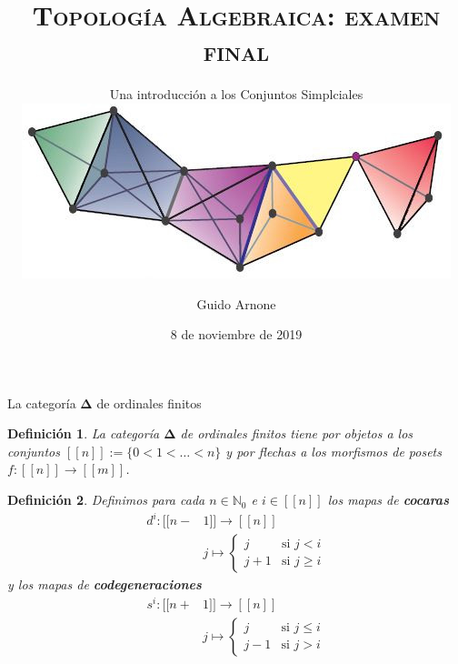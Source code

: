 \documentclass[11pt]{beamer}
\newcommand{\N}{\mathbb{N}}
\newcommand{\nat}[1]{[\![#1]\!]}
\newcommand{\ord}[1]{\nat{#1}}
\newcommand{\ordcat}{\boldsymbol{\Delta}}
\newtheorem{defs}{Definición}
\begin{document}
\author{Guido Arnone}
\title{\scshape Topología Algebraica: examen final}
\subtitle{Una introducción a los Conjuntos Simplciales\\
\vspace{20pt}
\includegraphics[width=0.75\textheight]{portada.jpg}}
\date{8 de noviembre de 2019}
\subject{Topología Algebraica}

\begin{frame}
\titlepage
\end{frame}

\begin{frame}{La categoría $\ordcat$ de ordinales finitos}
\begin{defs} La categoría $\ordcat$ de ordinales finitos \texttt{}tiene por objetos a los conjuntos $\nat{n} := \{0 < 1 < \dots < n\}$ y por flechas a los morfismos de posets $f : \nat{n} \to \nat{m}$.
\end{defs}

\begin{defs} Definimos para cada $n \in \N_0$ e $i \in \ord{n}$ los mapas de \textbf{cocaras} 
\begin{align*}
d^i : \ord{n-&1} \to \ord{n}\\
&j \mapsto \begin{cases}
j &\text{si $j < i$}\\
j+1 &\text{si $j \geq i$}
\end{cases}
\end{align*}
y los mapas de \textbf{codegeneraciones}
\begin{align*}
s^i : \ord{n+&1} \to \ord{n}\\
&j \mapsto \begin{cases}
j &\text{si $j \leq i$}\\
j-1 &\text{si $j > i$}
\end{cases}
\end{align*}
\end{defs}
\end{frame}
\end{document}
